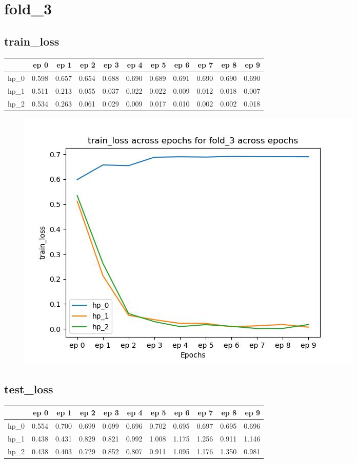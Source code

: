 \documentclass{article}
\begin{document}
\section{fold\_3}
\subsection{train\_loss}
\begin{tabular}{lrrrrrrrrrr}
\toprule
{} &   ep 0 &   ep 1 &   ep 2 &   ep 3 &   ep 4 &   ep 5 &   ep 6 &   ep 7 &   ep 8 &   ep 9 \\
\midrule
hp\_0 &  0.598 &  0.657 &  0.654 &  0.688 &  0.690 &  0.689 &  0.691 &  0.690 &  0.690 &  0.690 \\
hp\_1 &  0.511 &  0.213 &  0.055 &  0.037 &  0.022 &  0.022 &  0.009 &  0.012 &  0.018 &  0.007 \\
hp\_2 &  0.534 &  0.263 &  0.061 &  0.029 &  0.009 &  0.017 &  0.010 &  0.002 &  0.002 &  0.018 \\
\bottomrule
\end{tabular}

\begin{figure}[H]
\includegraphics[scale = 0.75]{fold_3/train_loss}
\end{figure}
\subsection{test\_loss}
\begin{tabular}{lrrrrrrrrrr}
\toprule
{} &   ep 0 &   ep 1 &   ep 2 &   ep 3 &   ep 4 &   ep 5 &   ep 6 &   ep 7 &   ep 8 &   ep 9 \\
\midrule
hp\_0 &  0.554 &  0.700 &  0.699 &  0.699 &  0.696 &  0.702 &  0.695 &  0.697 &  0.695 &  0.696 \\
hp\_1 &  0.438 &  0.431 &  0.829 &  0.821 &  0.992 &  1.008 &  1.175 &  1.256 &  0.911 &  1.146 \\
hp\_2 &  0.438 &  0.403 &  0.729 &  0.852 &  0.807 &  0.911 &  1.095 &  1.176 &  1.350 &  0.981 \\
\bottomrule
\end{tabular}
\end{document}
